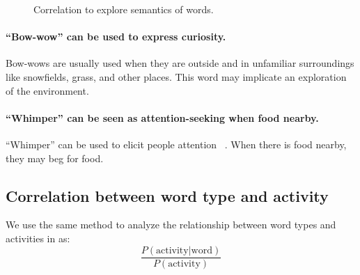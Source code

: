 \begin{figure}[h]
\begin{subfigure}[]{0.4\textwidth}
	\label{fig:sequenc_sound_context}
\end{subfigure}
\caption{Correlation to explore semantics of words.}
\label{fig:correlation}
\end{figure}



\paragraph{``Bow-wow'' can be used to express curiosity.}
Bow-wows are usually used when they are outside and in unfamiliar surroundings like snowfields, grass, and other places. This word may implicate an exploration of the environment. 
\paragraph{``Whimper'' can be seen as attention-seeking when food nearby.}
``Whimper'' can be used to elicit people attention ~\cite{handelman2012canine}. When there is food nearby, they may beg for food. 


\subsection{Correlation between word type and activity}
We use the same method to analyze the relationship between word types and 
activities in  as: 
\begin{equation}
\frac{P (\text{activity}| \text{word})}{P(\text{activity})}
\end{equation}
